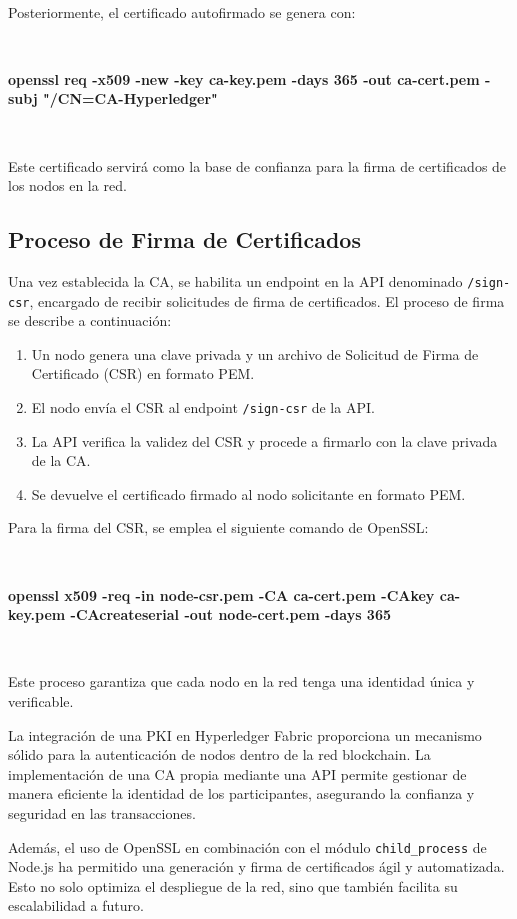 \

Posteriormente, el certificado autofirmado se genera con:

\

\small{\textbf{openssl req -x509 -new -key ca-key.pem -days 365 -out ca-cert.pem -subj "/CN=CA-Hyperledger"}}

\

Este certificado servirá como la base de confianza para la firma de certificados de los nodos en la red.

\subsection{Proceso de Firma de Certificados}

Una vez establecida la CA, se habilita un endpoint en la API denominado \texttt{/sign-csr}, encargado de recibir solicitudes de firma de certificados. El proceso de firma se describe a continuación:

\begin{enumerate}
    \item Un nodo genera una clave privada y un archivo de Solicitud de Firma de Certificado (CSR) en formato PEM.
    \item El nodo envía el CSR al endpoint \texttt{/sign-csr} de la API.
    \item La API verifica la validez del CSR y procede a firmarlo con la clave privada de la CA.
    \item Se devuelve el certificado firmado al nodo solicitante en formato PEM.
\end{enumerate}

Para la firma del CSR, se emplea el siguiente comando de OpenSSL:

\

\small{\textbf{openssl x509 -req -in node-csr.pem -CA ca-cert.pem -CAkey ca-key.pem -CAcreateserial -out node-cert.pem -days 365}}

\

Este proceso garantiza que cada nodo en la red tenga una identidad única y verificable.


La integración de una PKI en Hyperledger Fabric proporciona un mecanismo sólido para la autenticación de nodos dentro de la red blockchain. La implementación de una CA propia mediante una API permite gestionar de manera eficiente la identidad de los participantes, asegurando la confianza y seguridad en las transacciones.

Además, el uso de OpenSSL en combinación con el módulo \texttt{child\_process} de Node.js ha permitido una generación y firma de certificados ágil y automatizada. Esto no solo optimiza el despliegue de la red, sino que también facilita su escalabilidad a futuro.

